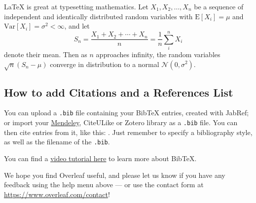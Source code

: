 \documentclass[a4paper]{article}
\begin{document}
\LaTeX{} is great at typesetting mathematics. Let $X_1, X_2, \ldots, X_n$ be a sequence of independent and identically distributed random variables with $\text{E}[X_i] = \mu$ and $\text{Var}[X_i] = \sigma^2 < \infty$, and let
\[S_n = \frac{X_1 + X_2 + \cdots + X_n}{n}
      = \frac{1}{n}\sum_{i}^{n} X_i\]
denote their mean. Then as $n$ approaches infinity, the random variables $\sqrt{n}(S_n - \mu)$ converge in distribution to a normal $\mathcal{N}(0, \sigma^2)$.

\subsection{How to add Citations and a References List}

You can upload a \verb|.bib| file containing your BibTeX entries, created with JabRef; or import your \href{https://www.overleaf.com/blog/184}{Mendeley}, CiteULike or Zotero library as a \verb|.bib| file. You can then cite entries from it, like this: \cite{greenwade93}. Just remember to specify a bibliography style, as well as the filename of the \verb|.bib|.

You can find a \href{https://www.overleaf.com/help/97-how-to-include-a-bibliography-using-bibtex}{video tutorial here} to learn more about BibTeX.

We hope you find Overleaf useful, and please let us know if you have any feedback using the help menu above --- or use the contact form at \url{https://www.overleaf.com/contact}!



\end{document}
